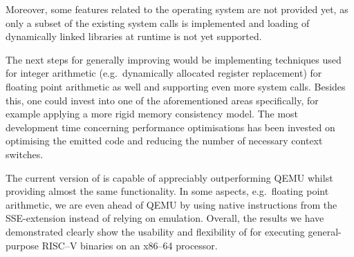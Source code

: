 Moreover, some features related to the operating system are not provided yet, as only a subset of the existing system calls is implemented and loading of dynamically linked libraries at runtime is not yet supported.

The next steps for generally improving \translatorname{} would be implementing techniques used for integer arithmetic (e.g.\ dynamically allocated register replacement) for floating point arithmetic as well and supporting even more system calls.
Besides this, one could invest into one of the aforementioned areas specifically, for example applying a more rigid memory consistency model.
The most development time concerning performance optimisations has been invested on optimising the emitted code and reducing the number of necessary context switches.

The current version of \translatorname{} is capable of appreciably outperforming QEMU whilst providing almost the same functionality.
In some aspects, e.g.\ floating point arithmetic, we are even ahead of QEMU by using native instructions from the SSE-extension instead of relying on emulation.
Overall, the results we have demonstrated clearly show the usability and flexibility of \translatorname{} for executing general-purpose RISC--V binaries on an x86--64 processor.